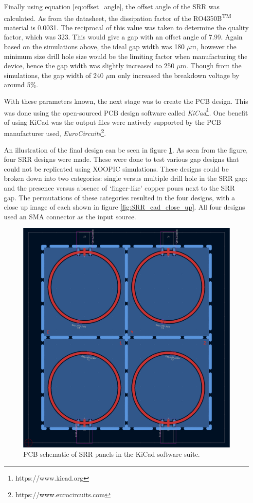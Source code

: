 Finally using equation \ref{eq:offset_angle}, the offset angle of the SRR was calculated. As from the datasheet, the dissipation factor of the RO4350B\textsuperscript{TM} material is 0.0031. The reciprocal of this value was taken to determine the quality factor, which was 323. This would give a gap with an offset angle of 7.99. Again based on the simulations above, the ideal gap width was 180 $\mu$m, however the minimum size drill hole size would be the limiting factor when manufacturing the device, hence the gap width was slightly increased to 250 $\mu$m. Though from the simulations, the gap width of 240 $\mu$m only increased the breakdown voltage by around 5\%.

With these parameters known, the next stage was to create the PCB design. This was done using the open-sourced PCB design software called \textit{KiCad}\footnote{https://www.kicad.org}. One benefit of using KiCad was the output files were natively supported by  the PCB manufacturer used, \textit{EuroCircuits}\footnote{https://www.eurocircuits.com}. 

An illustration of the final design can be seen in figure \ref{fig:SRR_cad}. As seen from the figure, four SRR designs were made. These were done to test various gap designs that could not be replicated using XOOPIC simulations. These designs could be broken down into two categories: single versus multiple drill hole in the SRR gap; and the presence versus absence of `finger-like' copper pours next to the SRR gap. The permutations of these categories resulted in the four designs, with a close up image of each shown in figure \ref{fig:SRR_cad_close_up}. All four designs used an SMA connector as the input source. 

\begin{figure}[h!]
	\centering
	\includegraphics[width=0.8\linewidth]{chapter_4/figures/SRR_CAD.png}
	\caption{PCB schematic of SRR panels in the KiCad software suite.}
	\label{fig:SRR_cad}
\end{figure}

